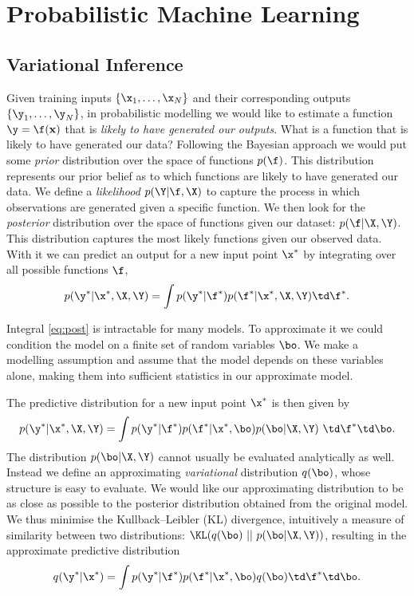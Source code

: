 \section{Probabilistic Machine Learning}
\subsection{Variational Inference}

Given training inputs $\{ \x_1, \hdots, \x_N \}$ and their corresponding outputs $\{\y_1, \hdots, \y_N\}$, in probabilistic modelling we would like to estimate a function $\y = \f(\mathbf{x})$ that is \textit{likely to have generated our outputs}. 
What is a function that is likely to have generated our data? Following the Bayesian approach we would put some \textit{prior} distribution over the space of functions $p(\f)$. This distribution represents our prior belief as to which functions are likely to have generated our data. 
We define a \textit{likelihood} $p(\Y | \f, \X)$ to capture the process in which observations are generated given a specific function.
We then look for the \textit{posterior} distribution over the space of functions given our dataset: $p(\f | \X, \Y)$.
This distribution captures the most likely functions given our observed data.
With it we can predict an output for a new input point $\x^*$ by integrating over all possible functions $\f$,
\begin{align} \label{eq:post}
p(\y^* | \x^*, \X, \Y) = \int p(\y^* | \f^*) p(\f^* | \x^*, \X, \Y) \td \f^*.
\end{align}

Integral \eqref{eq:post} is intractable for many models. 
To approximate it we could condition the model on a finite set of random variables $\bo$. We make a modelling assumption and assume that the model depends on these variables alone, making them into sufficient statistics in our approximate model.

The predictive distribution for a new input point $\x^*$ is then given by 
$$
p(\y^* | \x^*, \X, \Y) = \int p(\y^* | \f^*) p(\f^* | \x^*, \bo) p(\bo | \X, \Y)\ \td \f^* \td \bo.
$$
The distribution $p(\bo | \X, \Y)$ cannot usually be evaluated analytically as well. Instead we define an approximating \textit{variational} distribution $q(\bo)$, whose structure is easy to evaluate.
We would like our approximating distribution to be as close as possible to the posterior distribution obtained from the original model. We thus minimise the Kullback--Leibler (KL) divergence, intuitively a measure of similarity between two distributions: $\KL(q(\bo) ~||~ p(\bo | \X, \Y))$,
resulting in the approximate predictive distribution 
\begin{align} \label{eq:predictive}
q(\y^* | \x^*) = \int p(\y^* | \f^*) p(\f^* | \x^*, \bo) q(\bo) \td \f^* \td \bo.
\end{align}

